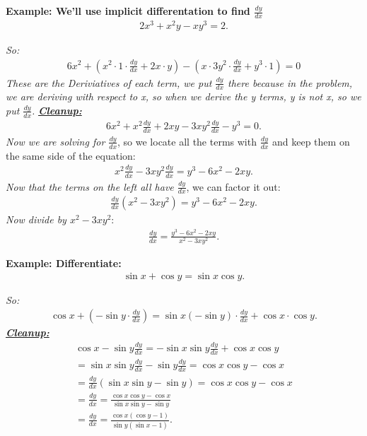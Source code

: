 \documentclass{report}
\begin{document}
  \bigbreak \noindent 
  \begin{mdframed}
    \textbf{Example: We'll use implicit differentation to find $\frac{dy}{dx}$}
    \begin{align*}
      2x^{3} +x^{2}y - xy^{3} = 2
    .\end{align*}
  \end{mdframed}
  \bigbreak \noindent 
  \bigbreak \noindent
  \textit{So:}
  \begin{align*}
    6x^{2} + (x^{2} \cdot 1\cdot \frac{dy}{dx} + 2x \cdot y) - (x \cdot 3y^{2} \cdot \frac{dy}{dx} +y^{3}\cdot 1) =  0
  \end{align*}
  \bigbreak \noindent 
  \textit{These are the Deriviatives of each term, we put $\frac{dy}{dx}$ there because in the problem, we are deriving with respect to x,
    so when we derive the y terms, y is not x, so we put $\frac{dy}{dx}$.
  }
  \bigbreak \noindent 
  \textbf{\textit{\underline{Cleanup:}}}
  \begin{align*}
    6x^{2} + x^{2}\frac{dy}{dx}+2xy - 3xy^{2}\frac{dy}{dx}- y^{3} = 0
  .\end{align*}
  \textit{Now we are solving for $\frac{dy}{dx}$}, so we locate all the terms with $\frac{dy}{dx}$ and keep them on the same side of the equation:
  \begin{align*}
   x^{2}\frac{dy}{dx}-3xy^{2}\frac{dy}{dx} = y^{3}-6x^{2}-2xy
  .\end{align*}
  \bigbreak \noindent 
  \textit{Now that the terms on the left all have $\frac{dy}{dx}$}, we can factor it out:
  \begin{align*}
    \frac{dy}{dx}(x^{2}-3xy^{2}) = y^{3} - 6x^{2} - 2xy
  .\end{align*}
  \bigbreak \noindent 
  \textit{Now divide by $x^{2}-3xy^{2}$}:
  \begin{align*}
   \frac{dy}{dx} = \frac{y^{3}-6x^{2}-2xy}{x^{2}-3xy^{2}} 
  .\end{align*}

  \bigbreak \noindent 
  \begin{mdframed}
    \textbf{Example: Differentiate:}
    \begin{align*}
      \sin{x} + \cos{y} = \sin{x}\cos{y}
    .\end{align*}
  \end{mdframed}
  \bigbreak \noindent 
  \textit{So:}
  \begin{align*}
    \cos{x} + (-\sin{y}\cdot \frac{dy}{dx}) = \sin{x}(-\sin{y})\cdot \frac{dy}{dx} + \cos{x} \cdot \cos{y}
  .\end{align*}
  \bigbreak \noindent 
  \textbf{\textit{\underline{Cleanup:}}}
  \begin{align*}
    \cos{x}-\sin{y}\frac{dy}{dx} = -\sin{x}\sin{y}\frac{dy}{dx} + \cos{x}\cos{y} \\ 
    = \sin{x}\sin{y}\frac{dy}{dx}-\sin{y}\frac{dy}{dx} =  \cos{x}\cos{y}-\cos{x} \\
    = \frac{dy}{dx}(\sin{x}\sin{y}-\sin{y}) = \cos{x}\cos{y}-\cos{x} \\ 
    = \frac{dy}{dx} = \frac{\cos{x}\cos{y} - \cos{x}}{\sin{x}\sin{y} - \sin{y}} \\
    = \frac{dy}{dx} = \frac{\cos{x}(\cos{y}-1)}{\sin{y}(\sin{x} -1)}
  .\end{align*}
\end{document}
